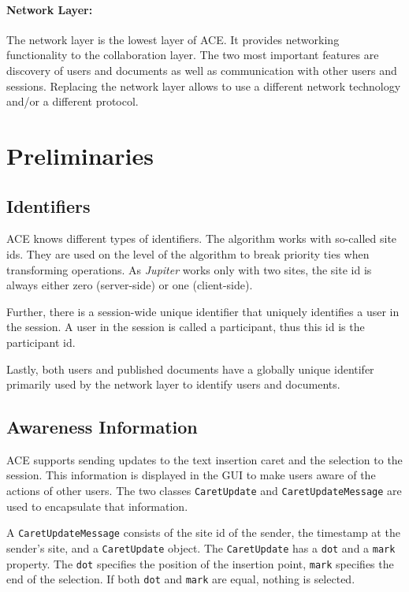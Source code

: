 \paragraph{Network Layer:} The network layer is the lowest layer of ACE. It 
provides networking functionality to the collaboration layer. The two most 
important features are discovery of users and documents as well as communication 
with other users and sessions. Replacing the network layer allows to use a 
different network technology and/or a different protocol.



\section{Preliminaries}

\subsection{Identifiers}
ACE knows different types of identifiers. The algorithm works with so-called
site ids. They are used on the level of the algorithm to break priority
ties when transforming operations. As \emph{Jupiter} works only with two
sites, the site id is always either zero (server-side) or one (client-side).

Further, there is a session-wide unique identifier that uniquely identifies
a user in the session. A user in the session is called a participant, thus
this id is the participant id.

Lastly, both users and published documents have a globally unique identifer
primarily used by the network layer to identify users and documents.


\subsection{Awareness Information}
ACE supports sending updates to the text insertion caret and the selection
to the session. This information is displayed in the GUI to make users
aware of the actions of other users. The two classes \texttt{Caret\-Update}
and \texttt{Caret\-Update\-Message} are used to encapsulate that information.

A \texttt{Caret\-Update\-Message} consists of the site id of the sender, the
timestamp at the sender's site, and a \texttt{Caret\-Update} object. The
\texttt{Caret\-Update} has a \texttt{dot} and a \texttt{mark} property. The
\texttt{dot} specifies the position of the insertion point, \texttt{mark} 
specifies the end of the selection. If both \texttt{dot} and \texttt{mark} are 
equal, nothing is selected. 

